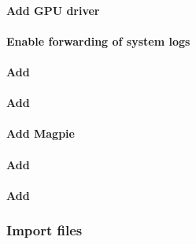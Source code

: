 \documentclass[letterpaper]{article}
\begin{document}
%
%
%

\paragraph{Add GPU driver}


\paragraph{Enable forwarding of system logs} \label{sec:add_syslog}


\paragraph{Add \clustershell{}}


\paragraph{Add \genders{}}


\paragraph{Add Magpie}


\paragraph{Add \conman{}} \label{sec:add_conman}


\paragraph{Add \nhc{}} \label{sec:add_nhc}



\subsubsection{Import files} \label{sec:file_import}







\end{document}
